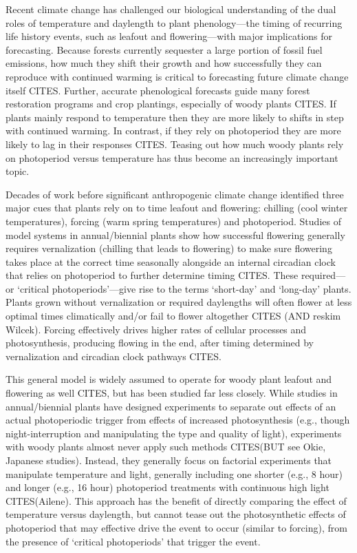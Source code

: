 \documentclass[11pt]{article}
\begin{document}
Recent climate change has challenged our biological understanding of the dual roles of temperature and daylength to plant phenology---the timing of recurring life history events, such as leafout and flowering---with major implications for forecasting. Because forests currently sequester a large portion of fossil fuel emissions, how much they shift their growth and how successfully they can reproduce with continued warming is critical to forecasting future climate change itself CITES. Further, accurate phenological forecasts guide many forest restoration programs and crop plantings, especially of woody plants CITES. If plants mainly respond to temperature then they are more likely to shifts in step with continued warming. In contrast, if they rely on photoperiod they are more likely to lag in their responses CITES. Teasing out how much woody plants rely on photoperiod versus temperature has thus become an increasingly important topic.

Decades of work before significant anthropogenic climate change identified three major cues that plants rely on to time leafout and flowering: chilling (cool winter temperatures), forcing (warm spring temperatures) and photoperiod. Studies of model systems in annual/biennial plants show how successful flowering generally requires vernalization (chilling that leads to flowering) to make sure flowering takes place at the correct time seasonally alongside an internal circadian clock that relies on photoperiod to further determine timing CITES. These required---or `critical photoperiods'---give rise to the terms `short-day' and `long-day' plants. Plants grown without vernalization or required daylengths will often flower at less optimal times climatically and/or fail to flower altogether CITES (AND reskim Wilcek). Forcing effectively drives higher rates of cellular processes and photosynthesis, producing flowing in the end, after timing determined by vernalization and circadian clock pathways CITES.  

This general model is widely assumed to operate for woody plant leafout and flowering as well CITES, but has been studied far less closely. While studies in annual/biennial plants have designed experiments to separate out effects of an actual photoperiodic trigger from effects of increased photosynthesis (e.g., though night-interruption and manipulating the type and quality of light), experiments with woody plants almost never apply such methods CITES(BUT see Okie, Japanese studies). Instead, they generally focus on factorial experiments that manipulate temperature and light, generally including one shorter (e.g., 8 hour) and longer (e.g., 16 hour) photoperiod treatments with continuous high light CITES(Ailene). This approach has the benefit of directly comparing the effect of temperature versus daylength, but cannot tease out the photosynthetic effects of photoperiod that may effective drive the event to occur (similar to forcing), from the presence of `critical photoperiods' that trigger the event.
\end{document}
